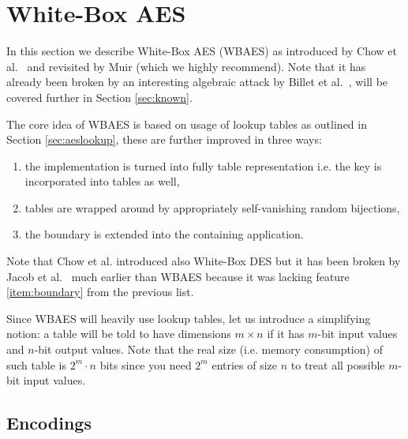 \section{White-Box AES}
\label{sec:wbaes}

In this section we describe White-Box AES (WBAES) as introduced by Chow et al.\ \cite{chow2002aes} and revisited by Muir \cite{muir2013tutorial} (which we highly recommend). Note that it has already been broken by an interesting algebraic attack by Billet et al.\ \cite{billet2004cryptanalysis}, will be covered further in Section \ref{sec:known}.

The core idea of WBAES is based on usage of lookup tables as outlined in Section \ref{sec:aeslookup}, these are further improved in three ways:
\begin{enumerate}
	\item the implementation is turned into fully table representation i.e. the key is incorporated into tables as well,
	\item tables are wrapped around by appropriately self-vanishing random bijections, \label{item:wrap}
	\item the boundary is extended into the containing application. \label{item:boundary}
\end{enumerate}
Note that Chow et al. introduced also White-Box DES \cite{chow2003des} but it has been broken by Jacob et al.\ \cite{jacob2002attacking} much earlier than WBAES because it was lacking feature \ref{item:boundary} from the previous list.

\begin{notion}
\label{notion:table}
	Since WBAES will heavily use lookup tables, let us introduce a simplifying notion: a table will be told to have dimensions $m\times n$ if it has $m$-bit input values and $n$-bit output values. Note that the real size (i.e. memory consumption) of such table is $2^m\cdot n$ bits since you need $2^m$ entries of size $n$ to treat all possible $m$-bit input values.
\end{notion}



\subsection{Encodings}
\label{sec:encod}

